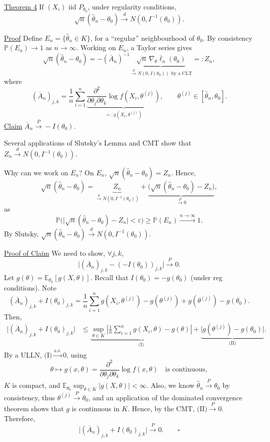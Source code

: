 \noindent\underline{Theorem 4}\quad
If $(X_i)$ iid $P_{\theta_0}$, under regularity conditions,
\[
\sqrt{n}(\hat{\theta}_n-\theta_0)\xrightarrow{d}N(0,I^{-1}(\theta_0)).
\]

\noindent\underline{Proof}\quad
Define $E_n=\{\hat{\theta}_n\in K\}$, for a ``regular'' neighbourhood of $\theta_0$.
By consistency $\mathbb{P}(E_n)\to1$ as $n\to\infty$.
Working on $E_n$, a Taylor series gives
\[
\sqrt{n}(\hat{\theta}_n-\theta_0)
=-(\overline{A}_n)^{-1}
\underbrace{\sqrt{n}\,\nabla_\theta\overline{\ell}_n(\theta_0)}
_{\xrightarrow{d}N(0,I(\theta_0))\text{ by a CLT}}
=:Z_n,
\]
where
\[
(\overline{A}_n)_{j,k}
=\frac1n\sum_{i=1}^n
\underbrace{\frac{\partial^2}{\partial\theta_j\partial\theta_k}
\log f(X_i,\theta^{(j)})}_{=:g(X_i,\theta^{(j)})},
\qquad\theta^{(j)}\in[\hat{\theta}_n,\theta_0].
\]
\noindent\underline{Claim}\quad
$\overline{A}_n\xrightarrow{P}-I(\theta_0)$.

Several applications of Slutsky's Lemma and CMT show that
$Z_n\xrightarrow{d}N(0,I^{-1}(\theta_0))$.

Why can we work on $E_n$? On $E_n$,
$\sqrt{n}(\hat{\theta}_n-\theta_0)=Z_n$. Hence,
\[
\sqrt{n}(\hat{\theta}_n-\theta_0)
=\underbrace{Z_n}_{\xrightarrow{d}N(0,I^{-1}(\theta_0))}
+\underbrace{\bigl(\sqrt{n}(\hat{\theta}_n-\theta_0)-Z_n\bigr)}
_{\xrightarrow{P}0},
\]
as
\[
\mathbb{P}\bigl(\lvert\sqrt{n}(\hat{\theta}_n-\theta_0)-Z_n\rvert<\varepsilon\bigr)
\geq\mathbb{P}(E_n)\xrightarrow{n\to\infty}1.
\]
By Slutsky,
$\sqrt{n}(\hat{\theta}_n-\theta_0)\xrightarrow{d}N(0,I^{-1}(\theta_0))$.

\medskip
\noindent\underline{Proof of Claim}\quad
We need to show, $\forall j,k$,
\[
\lvert(\overline{A}_n)_{j,k}-(-I(\theta_0))_{j,k}\rvert\xrightarrow{P}0.
\]
Let $g(\theta)=\mathbb{E}_{\theta_0}[g(X,\theta)]$.
Recall that $I(\theta_0)=-g(\theta_0)$ (under reg conditions).
Note
\[
(\overline{A}_n)_{j,k}+I(\theta_0)_{j,k}
=\frac1n\sum_{i=1}^n g(X_i,\theta^{(j)})-g(\theta^{(j)})
+g(\theta^{(j)})-g(\theta_0).
\]
Then,
\[
\begin{aligned}
\lvert(\overline{A}_n)_{j,k}+I(\theta_0)_{j,k}\rvert
&\leq\underbrace{\sup_{\theta\in K}
\left\lvert\frac1n\sum_{i=1}^n g(X_i,\theta)-g(\theta)\right\rvert}_{\text{(I)}}
+\underbrace{\lvert g(\theta^{(j)})-g(\theta_0)\rvert}_{\text{(II)}}.
\end{aligned}
\]
By a ULLN, $\text{(I)}\xrightarrow{\mathrm{a.s.}}0$, using
\[
\theta\longmapsto g(x,\theta)
=\frac{\partial^2}{\partial\theta_j\partial\theta_k}\log f(x,\theta)
\quad\text{is continuous},
\]
$K$ is compact, and
$\mathbb{E}_{\theta_0}\sup_{\theta\in K}|g(X,\theta)|<\infty$.
Also, we know $\hat{\theta}_n\xrightarrow{P}\theta_0$ by consistency,
thus $\theta^{(j)}\xrightarrow{P}\theta_0$, and an application of the
dominated convergence theorem shows that $g$ is continuous in $K$.
Hence, by the CMT,
$\text{(II)}\xrightarrow{P}0$.
Therefore,
\[
\lvert(\overline{A}_n)_{j,k}+I(\theta_0)_{j,k}\rvert\xrightarrow{P}0.
\qquad\square
\]

